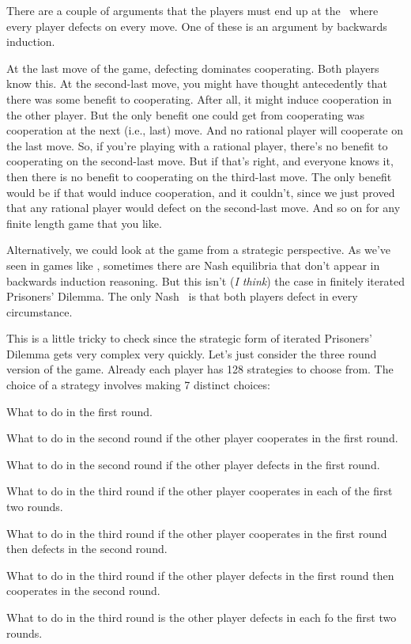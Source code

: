 There are a couple of arguments that the players must end up at the \eqm\ where every player defects on every move. One of these is an argument by backwards induction. 

At the last move of the game, defecting dominates cooperating. Both players know this. At the second-last move, you might have thought antecedently that there was some benefit to cooperating. After all, it might induce cooperation in the other player. But the only benefit one could get from cooperating was cooperation at the next (i.e., last) move. And no rational player will cooperate on the last move. So, if you're playing with a rational player, there's no benefit to cooperating on the second-last move. But if that's right, and everyone knows it, then there is no benefit to cooperating on the third-last move. The only benefit would be if that would induce cooperation, and it couldn't, since we just proved that any rational player would defect on the second-last move. And so on for any finite length game that you like.

Alternatively, we could look at the game from a strategic perspective. As we've seen in games like , sometimes there are Nash equilibria that don't appear in backwards induction reasoning. But this isn't (\textit{I think}) the case in finitely iterated Prisoners' Dilemma. The only Nash \eqm\ is that both players defect in every circumstance.

This is a little tricky to check since the strategic form of iterated Prisoners' Dilemma gets very complex very quickly. Let's just consider the three round version of the game. Already each player has 128 strategies to choose from. The choice of a strategy involves making 7 distinct choices:

\begin{enumerate*}
\item What to do in the first round.
\item What to do in the second round if the other player cooperates in the first round.
\item What to do in the second round if the other player defects in the first round.
\item What to do in the third round if the other player cooperates in each of the first two rounds.
\item What to do in the third round if the other player cooperates in the first round then defects in the second round.
\item What to do in the third round if the other player defects in the first round then cooperates in the second round.
\item What to do in the third round is the other player defects in each fo the first two rounds.
\end{enumerate*}

